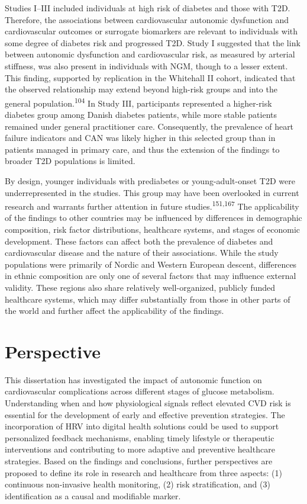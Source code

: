 \documentclass[
  a4paper,
  headsepline=true,
  open=left]{scrbook}
\begin{document}
Studies I--III included individuals at high risk of diabetes and those
with T2D. Therefore, the associations between cardiovascular autonomic
dysfunction and cardiovascular outcomes or surrogate biomarkers are
relevant to individuals with some degree of diabetes risk and progressed
T2D. Study I suggested that the link between autonomic dysfunction and
cardiovascular risk, as measured by arterial stiffness, was also present
in individuals with NGM, though to a lesser extent. This finding,
supported by replication in the Whitehall II cohort, indicated that the
observed relationship may extend beyond high-risk groups and into the
general population.\textsuperscript{104} In Study III, participants
represented a higher-risk diabetes group among Danish diabetes patients,
while more stable patients remained under general practitioner care.
Consequently, the prevalence of heart failure indicators and CAN was
likely higher in this selected group than in patients managed in primary
care, and thus the extension of the findings to broader T2D populations
is limited.

By design, younger individuals with prediabetes or young-adult-onset T2D
were underrepresented in the studies. This group may have been
overlooked in current research and warrants further attention in future
studies.\textsuperscript{151,167} The applicability of the findings to
other countries may be influenced by differences in demographic
composition, risk factor distributions, healthcare systems, and stages
of economic development. These factors can affect both the prevalence of
diabetes and cardiovascular disease and the nature of their
associations. While the study populations were primarily of Nordic and
Western European descent, differences in ethnic composition are only one
of several factors that may influence external validity. These regions
also share relatively well-organized, publicly funded healthcare
systems, which may differ substantially from those in other parts of the
world and further affect the applicability of the findings.


\hypertarget{perspective}{%
\chapter{Perspective}\label{perspective}}

\clearpage
\null
\thispagestyle{empty}
\clearpage

This dissertation has investigated the impact of autonomic function on
cardiovascular complications across different stages of glucose
metabolism. Understanding when and how physiological signals reflect
elevated CVD risk is essential for the development of early and
effective prevention strategies. The incorporation of HRV into digital
health solutions could be used to support personalized feedback
mechanisms, enabling timely lifestyle or therapeutic interventions and
contributing to more adaptive and preventive healthcare strategies.
Based on the findings and conclusions, further perspectives are proposed
to define its role in research and healthcare from three aspects: (1)
continuous non-invasive health monitoring, (2) risk stratification, and
(3) identification as a causal and modifiable marker.
\end{document}
